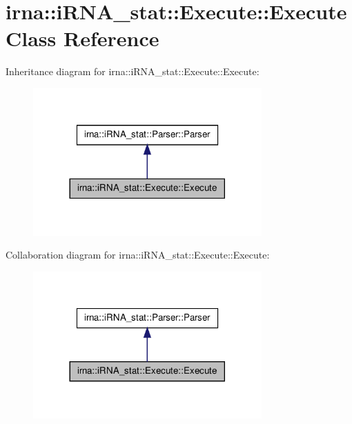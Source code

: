 \hypertarget{classirna_1_1iRNA__stat_1_1Execute_1_1Execute}{
\section{irna\-:\-:i\-R\-N\-A\-\_\-stat\-:\-:\-Execute\-:\-:\-Execute \-Class \-Reference}
\label{classirna_1_1iRNA__stat_1_1Execute_1_1Execute}
}


\-Inheritance diagram for irna\-:\-:i\-R\-N\-A\-\_\-stat\-:\-:\-Execute\-:\-:\-Execute\-:\nopagebreak
\begin{figure}[H]
\begin{center}
\leavevmode
\includegraphics[width=248pt]{classirna_1_1iRNA__stat_1_1Execute_1_1Execute__inherit__graph}
\end{center}
\end{figure}


\-Collaboration diagram for irna\-:\-:i\-R\-N\-A\-\_\-stat\-:\-:\-Execute\-:\-:\-Execute\-:\nopagebreak
\begin{figure}[H]
\begin{center}
\leavevmode
\includegraphics[width=248pt]{classirna_1_1iRNA__stat_1_1Execute_1_1Execute__coll__graph}
\end{center}
\end{figure}
